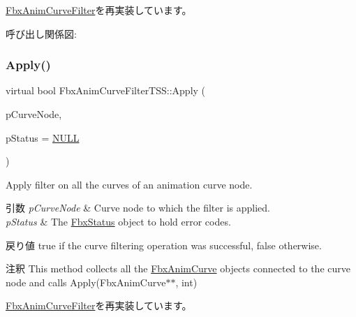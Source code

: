 \hyperlink{class_fbx_anim_curve_filter_a009498a65af4995bf5e5908f17837531}{Fbx\+Anim\+Curve\+Filter}を再実装しています。

呼び出し関係図\+:
\mbox{\label{class_fbx_anim_curve_filter_t_s_s_a9d6e08d720db38d5d795c3993298ada2}} 
\subsubsection{\texorpdfstring{Apply()}{Apply()}\hspace{0.1cm}{\footnotesize\ttfamily [3/5]}}
{\footnotesize\ttfamily virtual bool Fbx\+Anim\+Curve\+Filter\+T\+S\+S\+::\+Apply (\begin{DoxyParamCaption}\item[{\hyperlink{class_fbx_anim_curve_node}{Fbx\+Anim\+Curve\+Node} \&}]{p\+Curve\+Node,  }\item[{\hyperlink{class_fbx_status}{Fbx\+Status} $\ast$}]{p\+Status = {\ttfamily \hyperlink{fbxarch_8h_a070d2ce7b6bb7e5c05602aa8c308d0c4}{N\+U\+LL}} }\end{DoxyParamCaption})\hspace{0.3cm}{\ttfamily [virtual]}}

Apply filter on all the curves of an animation curve node. 
\begin{DoxyParams}{引数}
{\em p\+Curve\+Node} & Curve node to which the filter is applied. \\
\hline
{\em p\+Status} & The \hyperlink{class_fbx_status}{Fbx\+Status} object to hold error codes. \\
\hline
\end{DoxyParams}
\begin{DoxyReturn}{戻り値}
{\ttfamily true} if the curve filtering operation was successful, {\ttfamily false} otherwise. 
\end{DoxyReturn}
\begin{DoxyRemark}{注釈}
This method collects all the \hyperlink{class_fbx_anim_curve}{Fbx\+Anim\+Curve} objects connected to the curve node and calls Apply(\+Fbx\+Anim\+Curve$\ast$$\ast$, int) 
\end{DoxyRemark}


\hyperlink{class_fbx_anim_curve_filter_ad042b45c0675278fa49e61739b0825c2}{Fbx\+Anim\+Curve\+Filter}を再実装しています。

